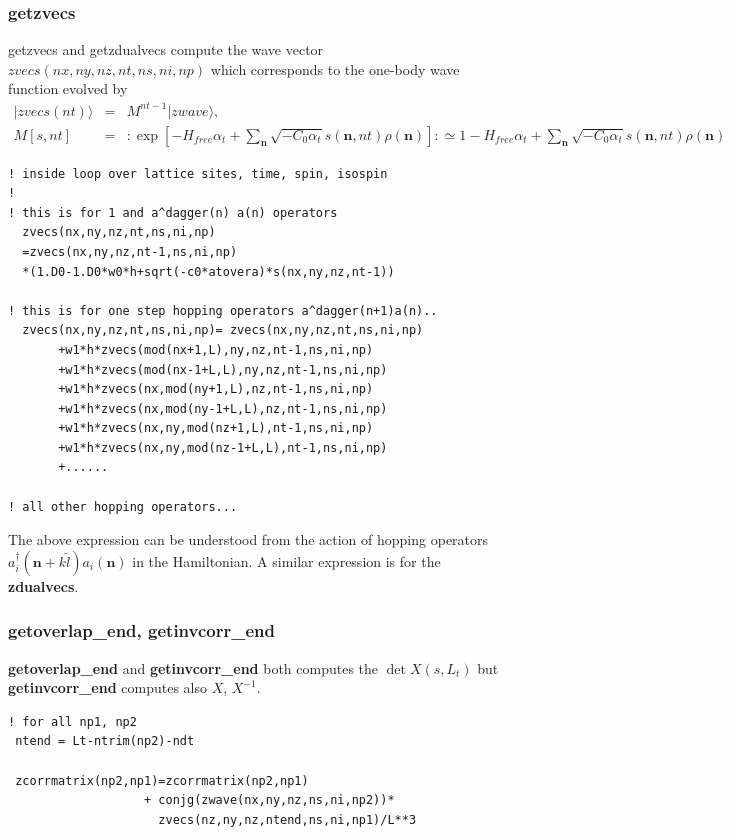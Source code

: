 \documentclass[10pt]{book}
\def\bm{\boldsymbol}
\newcommand{\bea}{\begin{eqnarray}}
\newcommand{\eea}{\end{eqnarray}}
\newcommand{\no}{\nonumber \\}
\def\vn{{\bm n}}
\def\ra{\rangle}
\begin{document}
\subsubsection{getzvecs} 
getzvecs and getzdualvecs compute the wave vector $zvecs(nx,ny,nz,nt,ns,ni,np)$
which corresponds to the one-body wave function evolved by 
\bea 
|zvecs(nt)\ra&=&M^{nt-1}|zwave\ra ,\no 
M[s,nt]&=& : \exp[-H_{free}\alpha_t+\sum_{\vn} \sqrt{-C_0\alpha_t} s(\vn,nt)\rho(\vn)]:
        \simeq 1-H_{free}\alpha_t+\sum_{\vn} \sqrt{-C_0\alpha_t} s(\vn,nt)\rho(\vn)
\eea 
\begin{lstlisting}[frame=single]
! inside loop over lattice sites, time, spin, isospin
!
! this is for 1 and a^dagger(n) a(n) operators
  zvecs(nx,ny,nz,nt,ns,ni,np)
  =zvecs(nx,ny,nz,nt-1,ns,ni,np)
  *(1.D0-1.D0*w0*h+sqrt(-c0*atovera)*s(nx,ny,nz,nt-1))

! this is for one step hopping operators a^dagger(n+1)a(n)..  
  zvecs(nx,ny,nz,nt,ns,ni,np)= zvecs(nx,ny,nz,nt,ns,ni,np)
       +w1*h*zvecs(mod(nx+1,L),ny,nz,nt-1,ns,ni,np)
       +w1*h*zvecs(mod(nx-1+L,L),ny,nz,nt-1,ns,ni,np)
       +w1*h*zvecs(nx,mod(ny+1,L),nz,nt-1,ns,ni,np)
       +w1*h*zvecs(nx,mod(ny-1+L,L),nz,nt-1,ns,ni,np)       
       +w1*h*zvecs(nx,ny,mod(nz+1,L),nt-1,ns,ni,np)       
       +w1*h*zvecs(nx,ny,mod(nz-1+L,L),nt-1,ns,ni,np)
       +......

! all other hopping operators...
\end{lstlisting}
The above expression can be understood from the action of hopping operators
$a^\dagger_i({\bm n}+k\hat{l}) a_i({\bm n})$ in the Hamiltonian.
A similar expression is for the {\bf zdualvecs}.

\subsubsection{getoverlap\_end, getinvcorr\_end } 
{\bf getoverlap\_end} and {\bf getinvcorr\_end} both computes the 
$\det X(s,L_t)$ but {\bf getinvcorr\_end} computes also $X$, $X^{-1}$.
\begin{lstlisting}[frame=single]
! for all np1, np2 
 ntend = Lt-ntrim(np2)-ndt
 
 zcorrmatrix(np2,np1)=zcorrmatrix(np2,np1)
                   + conjg(zwave(nx,ny,nz,ns,ni,np2))*
                     zvecs(nz,ny,nz,ntend,ns,ni,np1)/L**3
\end{lstlisting}
\end{document}
